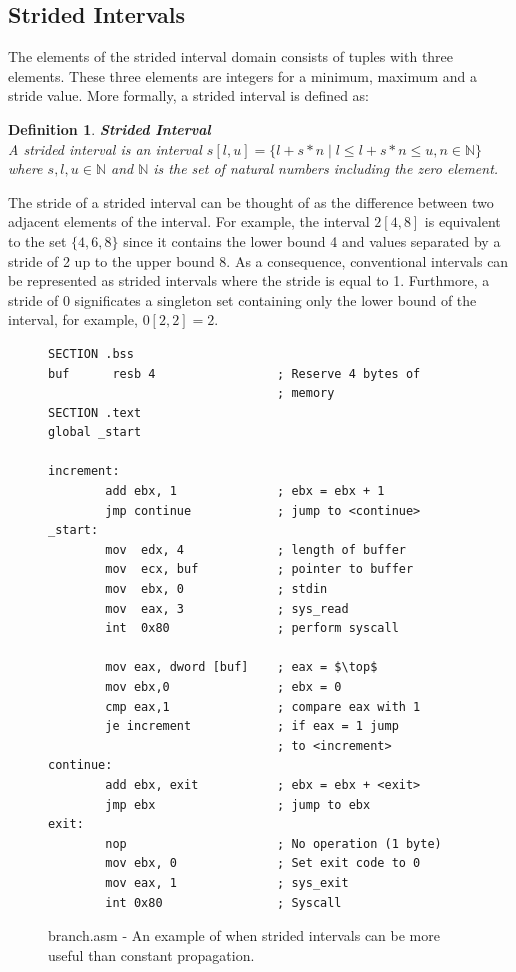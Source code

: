 \documentclass{kththesis}
\newtheorem*{definition}{Definition}
\newcommand{\fbcomment}[1]{{#1}}
\renewcommand{\fbcomment}[1]{}
\begin{document}
\subsection{Strided Intervals}\label{sec:absDomInt}
\fbcomment{\color{red}Goal: Introduce strided intervals and show an example of when it is more useful than constant propagation.}
The elements of the strided interval domain consists of tuples with three elements. These three elements are integers for a minimum, maximum and a stride value. More formally, a strided interval is defined as: 
\begin{definition}\textbf{Strided Interval}\\
A strided interval is an interval $s[l,u]=\{l + s * n\;|\;l \leq l + s * n \leq u, n \in \mathbb{N} \}$ where $s,l,u \in \mathbb{N}$ and $\mathbb{N}$ is the set of natural numbers including the zero element.
\end{definition}
\noindent The stride of a strided interval can be thought of as the difference between two adjacent elements of the interval. For example, the interval $2[4,8]$ is equivalent to the set $\{4,6,8\}$ since it contains the lower bound 4 and values separated by a stride of 2 up to the upper bound 8. As a consequence, conventional intervals can be represented as strided intervals where the stride is equal to 1. Furthmore, a stride of 0 significates a singleton set containing only the lower bound of the interval, for example, $0[2,2] = 2$.
\begin{figure}[ht]
    \centering
\begin{tcolorbox}
\begin{verbatim}
SECTION .bss
buf      resb 4                 ; Reserve 4 bytes of
                                ; memory
SECTION .text
global _start

increment:
        add ebx, 1              ; ebx = ebx + 1
        jmp continue            ; jump to <continue>
_start:
        mov  edx, 4             ; length of buffer
        mov  ecx, buf           ; pointer to buffer
        mov  ebx, 0             ; stdin
        mov  eax, 3             ; sys_read
        int  0x80               ; perform syscall

        mov eax, dword [buf]    ; eax = $\top$
        mov ebx,0               ; ebx = 0
        cmp eax,1               ; compare eax with 1
        je increment            ; if eax = 1 jump
                                ; to <increment>
continue:
        add ebx, exit           ; ebx = ebx + <exit>
        jmp ebx                 ; jump to ebx
exit:
        nop                     ; No operation (1 byte)
        mov ebx, 0              ; Set exit code to 0
        mov eax, 1              ; sys_exit
        int 0x80                ; Syscall
\end{verbatim}
\end{tcolorbox}
\caption{branch.asm - An example of when strided intervals can be more useful than constant propagation.}
    \label{fig:branch.asm}
\end{figure}
\end{document}
